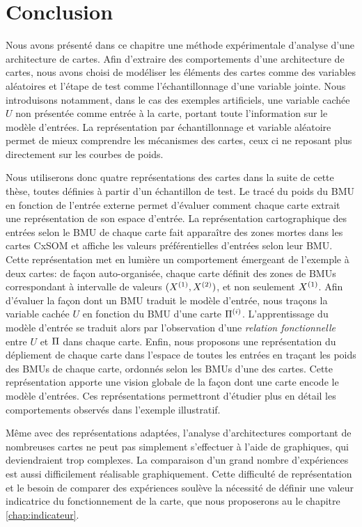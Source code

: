 \documentclass[../main]{subfiles}
\begin{document}
\section{Conclusion}

Nous avons présenté dans ce chapitre une méthode expérimentale d'analyse d'une architecture de cartes.
Afin d'extraire des comportements d'une architecture de cartes, nous avons choisi de modéliser les éléments des cartes comme des variables aléatoires et l'étape de test comme l'échantillonnage d'une variable jointe. Nous introduisons notamment, dans le cas des exemples artificiels, une variable cachée $U$ non présentée comme entrée à la carte, portant toute l'information sur le modèle d'entrées.
La représentation par échantillonnage et variable aléatoire permet de mieux comprendre les mécanismes des cartes, ceux ci ne reposant plus directement sur les courbes de poids.

Nous utiliserons donc quatre représentations des cartes dans la suite de cette thèse, toutes définies à partir d'un échantillon de test.
Le tracé du poids du BMU en fonction de l'entrée externe permet d'évaluer comment chaque carte extrait une représentation de son espace d'entrée.
La représentation cartographique des entrées selon le BMU de chaque carte fait apparaître des zones mortes dans les cartes CxSOM et affiche les valeurs préférentielles d'entrées selon leur BMU. Cette représentation met en lumière un comportement émergeant de l'exemple à deux cartes: de façon auto-organisée, chaque carte définit des zones de BMUs correspondant à intervalle de valeurs $(X^{({1})},X^{({2})})$, et non seulement $X^{({1})}$.
Afin d'évaluer la façon dont un BMU traduit le modèle d'entrée, nous traçons la variable cachée $U$ en fonction du BMU d'une carte $\Pi^{({i})}$.
L'apprentissage du modèle d'entrée se traduit alors par l'observation d'une \emph{relation fonctionnelle} entre $U$ et $\Pi$ dans chaque carte.
Enfin, nous proposons une représentation du dépliement de chaque carte dans l'espace de toutes les entrées en traçant les poids des BMUs de chaque carte, ordonnés selon les BMUs d'une des cartes. Cette représentation apporte une vision globale de la façon dont une carte encode le modèle d'entrées.
Ces représentations permettront d'étudier plus en détail les comportements observés dans l'exemple illustratif.

Même avec des représentations adaptées, l'analyse d'architectures comportant de nombreuses cartes ne peut pas simplement s'effectuer à l'aide de graphiques, qui deviendraient trop complexes. La comparaison d'un grand nombre d'expériences est aussi difficilement réalisable graphiquement.
Cette difficulté de représentation et le besoin de comparer des expériences soulève la nécessité de définir une valeur indicatrice du fonctionnement de la carte, que nous proposerons au le chapitre \ref{chap:indicateur}.
 

\ifSubfilesClassLoaded{
    \printbibliography
}{}
\end{document}
